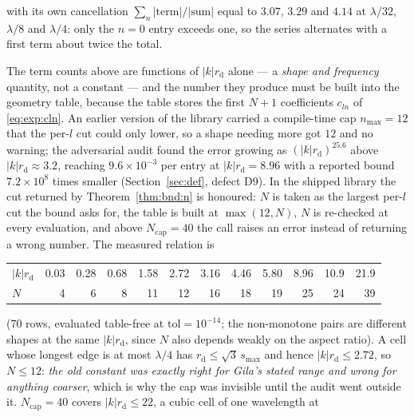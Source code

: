 \noindent
with its own cancellation $\sum_n|\text{term}|/|\text{sum}|$ equal to $3.07$, $3.29$ and
$4.14$ at $\lambda/32$, $\lambda/8$ and $\lambda/4$: only the $n=0$ entry exceeds one, so
the series alternates with a first term about twice the total.

\begin{remark}
\label{rem:bnd:adapt}
The term counts above are functions of $|k|r_{\mathrm{d}}$ alone --- a
\emph{shape and frequency} quantity, not a constant --- and the number they produce must be
built into the geometry table, because the table stores the first $N+1$ coefficients
$c_{ln}$ of \eqref{eq:exp:cln}. An earlier version of the library carried a compile-time cap
$n_{\max} = 12$ that the per-$l$ cut could only lower, so a shape needing more got $12$ and
no warning; the adversarial audit found the error growing as
$(|k|r_{\mathrm{d}})^{25.6}$ above $|k|r_{\mathrm{d}} \approx 3.2$, reaching
$9.6\times10^{-3}$ per entry at $|k|r_{\mathrm{d}} = 8.96$ with a reported bound
$7.2\times10^{8}$ times smaller (Section~\ref{sec:def}, defect D9). In the shipped library
the cut returned by Theorem~\ref{thm:bnd:n} is honoured: $N$ is taken as the largest
per-$l$ cut the bound asks for, the table is built at $\max(12, N)$, $N$ is re-checked at
every evaluation, and above $N_{\mathrm{cap}} = 40$ the call raises an error instead of
returning a wrong number. The measured relation is
\begin{center}\footnotesize
\begin{tabular}{@{}lrrrrrrrrrrr@{}}
\toprule
$|k|r_{\mathrm{d}}$ & 0.03 & 0.28 & 0.68 & 1.58 & 2.72 & 3.16 & 4.46 & 5.80 & 8.96 & 10.9 & 21.9\\
$N$ & 4 & 6 & 8 & 11 & 12 & 16 & 18 & 19 & 25 & 24 & 39\\
\bottomrule
\end{tabular}
\end{center}
\noindent
(70 rows, evaluated table-free at $\mathrm{tol} = 10^{-14}$; the non-monotone pairs are
different shapes at the same $|k|r_{\mathrm{d}}$, since $N$ also depends weakly on the
aspect ratio). A cell whose longest edge is at most $\lambda/4$ has
$r_{\mathrm{d}} \le \sqrt3\,s_{\max}$ and hence $|k|r_{\mathrm{d}} \le 2.72$, so
$N \le 12$: \emph{the old constant was exactly right for Gila's stated range and wrong for
anything coarser}, which is why the cap was invisible until the audit went outside it.
$N_{\mathrm{cap}} = 40$ covers $|k|r_{\mathrm{d}} \le 22$, a cubic cell of one wavelength at

\end{remark}
